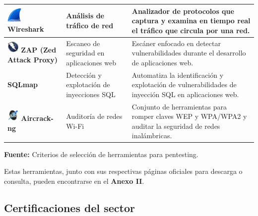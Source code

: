\documentclass[a4paper, 11pt]{article}
\begin{document}
\begin{table}[H]
\begin{tabular}{|m{5cm}|m{3.5cm}|m{8cm}|}
    \hline
    \includegraphics[width=0.75cm]{images/wireshark.png} \textbf{Wireshark} & Análisis de tráfico de red & Analizador de protocolos que captura y examina en tiempo real el tráfico que circula por una red. \\
    \hline
    \includegraphics[width=0.6cm]{images/zap.jpeg} \textbf{ZAP (Zed Attack Proxy)} & Escaneo de seguridad en aplicaciones web & Escáner enfocado en detectar vulnerabilidades durante el desarrollo de aplicaciones web. \\
    \hline
    \textbf{SQLmap} & Detección y explotación de inyecciones SQL & Automatiza la identificación y explotación de vulnerabilidades de inyección SQL en aplicaciones web. \\
    \hline
    \includegraphics[width=0.6cm]{images/aircrack.jpeg} \textbf{Aircrack-ng} & Auditoría de redes Wi-Fi & Conjunto de herramientas para romper claves WEP y WPA/WPA2 y auditar la seguridad de redes inalámbricas. \\
    \hline
\end{tabular}
\begin{flushleft}\centering
    \footnotesize \textbf{Fuente:} Criterios de selección de herramientas para pentesting. \cite{felipe2024}
\end{flushleft}
\end{table}
\par\vspace{0.5cm}
Estas herramientas, junto con sus respectivas páginas oficiales para descarga o consulta, pueden encontrarse en el \textbf{Anexo II}.

\par\vspace{0.5cm}


\subsection{Certificaciones del sector}
\par\vspace{0.5cm}
\end{document}
